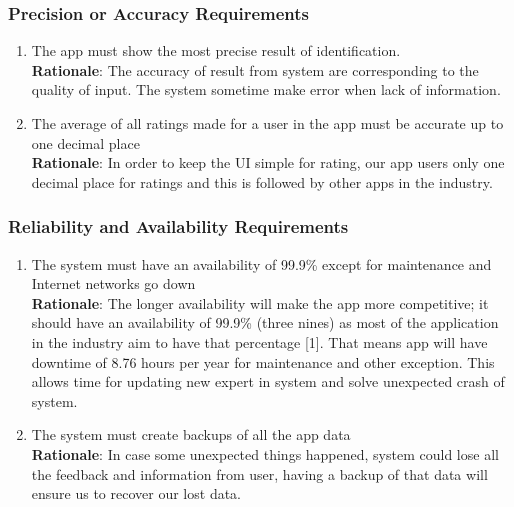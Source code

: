 \subsubsection{Precision or Accuracy Requirements}
\label{ssub:precision_or_accuracy_requirements}
\begin{enumerate}[{PR-PA}1. ]
	\item The app must show the most precise result of identification.\\ \textbf{Rationale}: The accuracy of result from system are corresponding to the quality of input. The system sometime make error when lack of information.
	\item The average of all ratings made for a user in the app must be accurate up to one decimal place\\ \textbf{Rationale}: In order to keep the UI simple for rating, our app users only one decimal place for ratings and this is followed by other apps in the industry. 
\end{enumerate}

\subsubsection{Reliability and Availability Requirements}
\label{ssub:reliability_and_availability_requirements}
\begin{enumerate}[{PR-RA}1. ]
	\item The system must have an availability of 99.9\% except for maintenance and Internet networks go down\\ \textbf{Rationale}: The longer availability will make the app more competitive; it should have an availability of 99.9\% (three nines) as most of the application in the industry aim to have that percentage [1]. That means app will have downtime of 8.76 hours per year for maintenance and other exception. This allows time for updating new expert in system and solve unexpected crash of system.
	\item The system must create backups of all the app data\\ \textbf{Rationale}: In case some unexpected things happened, system could lose all the feedback and information from user, having a backup of that data will ensure us to recover our lost data.
\end{enumerate}


